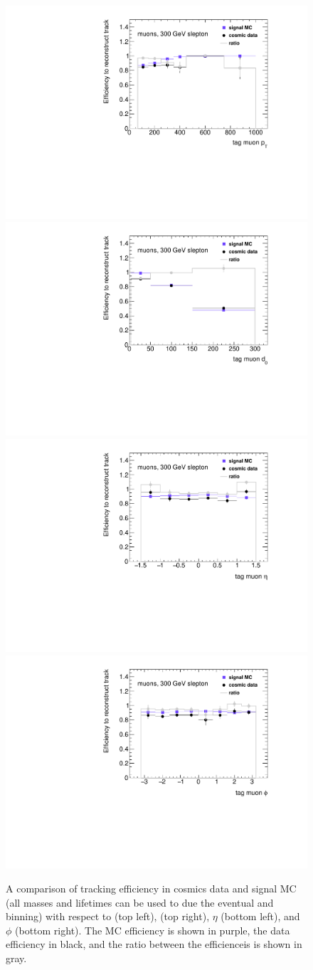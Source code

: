 \begin{figure}[htbp]
\centering
\includegraphics[width=.48\textwidth]{figures/LRT_systs/compare_pt_z0120_Rgd0_timing_idcuts_2dweight.pdf}
\includegraphics[width=.48\textwidth]{figures/LRT_systs/compare_d0_z0120_Rgd0_timing_idcuts_2dweight.pdf}
\includegraphics[width=.48\textwidth]{figures/LRT_systs/compare_eta_z0120_Rgd0_timing_idcuts_2dweight.pdf}
\includegraphics[width=.48\textwidth]{figures/LRT_systs/compare_phi_z0120_Rgd0_timing_idcuts_2dweight.pdf}
\caption{A comparison of tracking efficiency in cosmics data and signal MC (all masses and lifetimes can be used to due the eventual \pt and \dz binning) with respect to \pt (top left), \dz (top right), $\eta$ (bottom left), and $\phi$ (bottom right). The \ac{MC} efficiency is shown in purple, the data efficiency in black, and the ratio between the efficienceis is shown in gray.}
\label{fig:lrt_eff_comp}
\end{figure}




